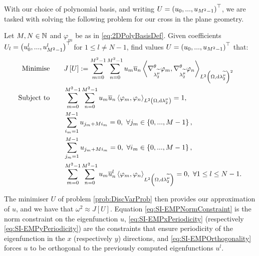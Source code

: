 With our choice of polynomial basis, and writing $U = \left( u_0,...,u_{M^2-1} \right)^\top$, we are tasked with solving the following problem for our cross in the plane geometry.
\begin{problem} \label{prob:DiscVarProb}
	Let $M,N\in\mathbb{N}$ and $\varphi_m$ be as in \eqref{eq:2DPolyBasisDef}.
	Given coefficients $U_l=\left( u^l_0,...,u^l_{M^2-1} \right)^\top$ for $1\leq l\neq N-1$, find values $U=\left( u_0,...,u_{M^2-1} \right)^\top$ that:
	\begin{subequations} \label{eq:SI-ExampleMinProb}
		\begin{align}
			\text{Minimise} \quad & \quad J\left[ U \right] := \sum_{m=0}^{M^2-1}\sum_{n=0}^{M^2-1}u_m\overline{u}_n\left\langle \nabla^{\theta}_{\lambda_2^{\widetilde{\mu}}}\varphi_m , \nabla^{\theta}_{\lambda_2^{\widetilde{\mu}}}\varphi_n \right\rangle_{L^{2}\left( \Omega,\mathrm{d} \lambda_2^{\widetilde{\mu}} \right)^2} 
			\label{eq:SI-EMPObjectiveFn} \\
			\text{Subject to} \quad & \quad \sum_{m=0}^{M^2-1}\sum_{n=0}^{M^2-1}u_m\overline{u}_n\left\langle \varphi_m , \varphi_n \right\rangle_{L^{2}\left( \Omega,\mathrm{d} \lambda_2^{\mu} \right)} = 1, 
			\label{eq:SI-EMPNormConstraint} \\
			& \quad \sum_{i_m=1}^{M-1}u_{j_m+Mi_m} = 0, \ \forall j_m\in\left\{ 0,...,M-1 \right\}, 
			\label{eq:SI-EMPxPeriodicity} \\
			& \quad \sum_{j_m=1}^{M-1}u_{j_m+Mi_m} = 0, \ \forall i_m\in\left\{ 0,...,M-1 \right\},
			\label{eq:SI-EMPyPeriodicity} \\
			& \quad \sum_{m=0}^{M^2-1}\sum_{n=0}^{M^2-1}u_m\overline{u}^l_n\left\langle \varphi_m , \varphi_n \right\rangle_{L^{2}\left( \Omega,\mathrm{d} \lambda_2^{\widetilde{\mu}} \right)} = 0, \ \forall 1\leq l\leq N-1.
			\label{eq:SI-EMPOrthogonality}
		\end{align}
	\end{subequations}
\end{problem}
The minimiser $U$ of problem \ref{prob:DiscVarProb} then provides our approximation of $u$, and we have that $\omega^2 \approx J[U]$.
Equation \eqref{eq:SI-EMPNormConstraint} is the norm constraint on the eigenfunction $u$, \eqref{eq:SI-EMPxPeriodicity} (respectively \eqref{eq:SI-EMPyPeriodicity}) are the constraints that ensure periodicity of the eigenfunction in the $x$ (respectively $y$) directions, and \eqref{eq:SI-EMPOrthogonality} forces $u$ to be orthogonal to the previously computed eigenfunctions $u^l$.

